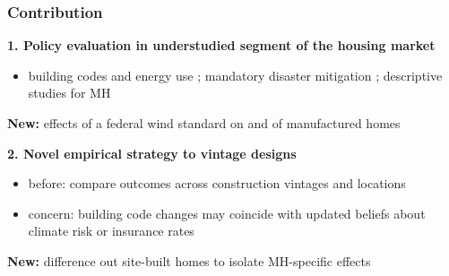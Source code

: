 \documentclass[11pt,xcolor={dvipsnames},hyperref={pdftex,pdfpagemode=UseNone,hidelinks,pdfdisplaydoctitle=true},usepdftitle=false,aspectratio=169]{beamer}
\newcommand{\gc}[1]{{\footnotesize\textcolor{gray}{#1}}}
\begin{document}
\begin{frame}
    \frametitle{Contribution}

    \small

    \textbf{1. Policy evaluation in understudied segment of the housing market}
    \begin{itemize}
        \item building codes and energy use \gc{\citep{jacobsen_are_2013, levinson_how_2016}}; mandatory disaster mitigation \gc{\citep{simmons_economic_2018, dehring_coastal_2013, baylis_mandated_2026}}; descriptive studies for MH \gc{\citep{simmons_manufactured_2008, kevin_r_grosskopf_manufactured_2005}}
    \end{itemize}

    \hspace{1em} \so \textbf{New:} effects of a federal wind standard on  and  of manufactured homes

    \vspace{1.2em}

    \textbf{2. Novel empirical strategy to vintage designs}
    \begin{itemize}
        \item before: compare outcomes across construction vintages and locations
        \item concern: building code changes may coincide with updated beliefs about climate risk or insurance rates
    \end{itemize}

    \hspace{1em} \so \textbf{New:} difference out site-built homes  to isolate MH-specific effects

\end{frame}



\begin{frame}
\end{frame}
\end{document}
